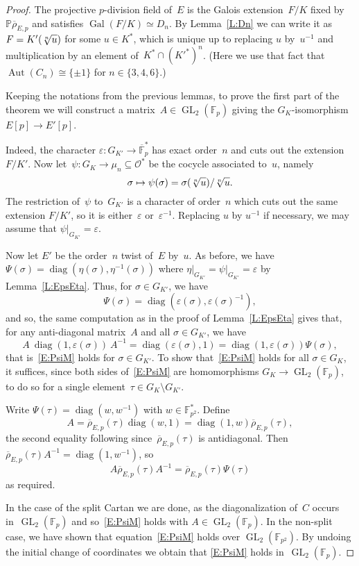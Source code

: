 \documentclass[twoside,leqno,symbols-for-thanks, draft]{rmi}
\numberwithin{equation}{section}
\newcommand{\F}{\mathbb{F}}
\newcommand{\Fp}{\mathbb{F}_p}
\newcommand{\PP}{\mathbb{P}}
\newcommand{\rhobar}{{\overline{\rho}}}
\newcommand{\eps}{\varepsilon}
\newcommand{\calO}{\mathcal{O}}
\DeclareMathOperator{\Aut}{Aut}
\DeclareMathOperator{\Gal}{Gal}
\newcommand{\GL}{\operatorname{GL}}
\newcommand{\diag}{{\operatorname{diag}}}
\theoremstyle{remark}
\begin{document}
\begin{proof} 
The projective $p$-division field of~$E$ is the Galois extension~$F/K$
fixed by $\PP \rhobar_{E,p}$ and satisfies $\Gal(F/K) \simeq D_n$. By
Lemma~\ref{L:Dn} we can write it as $F=K'(\root n\of u)$ for some
$u\in K^*$, which is unique up to replacing $u$ by~$u^{-1}$ and
multiplication by an element of~$K^*\cap(K'^*)^n$.  (Here we use that
fact that~$\Aut(C_n)\cong\{\pm1\}$ for $n\in\{3,4,6\}$.)

Keeping the notations from the previous lemmas, to prove the first
part of the theorem we will construct a matrix~$A\in\GL_2(\Fp)$
giving the $G_K$-isomorphism $E[p]\to E'[p]$.

Indeed, the character $\eps:G_{K'} \to
\overline{\F}_p^*$ has exact order~$n$ and cuts out the extension
$F/K'$.
Now let~$\psi:G_K\to \mu_n\subseteq\calO^*$ be the cocycle associated
to~$u$, namely
\[
\sigma\mapsto \psi(\sigma) = \sigma(\root n\of u)/\root n\of u.
\]
The restriction of~$\psi$ to~$G_{K'}$ is a character of order~$n$
which cuts out the same extension $F/K'$, so it is either~$\eps$ or~$\eps^{-1}$.  Replacing $u$ by $u^{-1}$ if necessary, we may assume that
$\left.\psi\right|_{G_{K'}} = \eps$.

Now let $E'$ be the order~$n$ twist of~$E$ by~$u$.  As before, we have
$\Psi(\sigma)=\diag(\eta(\sigma),\eta^{-1}(\sigma))$ where
$\left.\eta\right|_{G_{K'}} = \left.\psi\right|_{G_{K'}} = \eps$ by Lemma~\ref{L:EpsEta}.
Thus, for $\sigma\in G_{K'}$, we have
\[
\Psi(\sigma) = \diag(\eps(\sigma),\eps(\sigma)^{-1}),
\]
and so, the same computation as in the proof of Lemma~\ref{L:EpsEta} 
gives that, for any anti-diagonal matrix~$A$
and all $\sigma\in G_{K'}$, we have
\[
A\ \diag(1,\eps(\sigma))\ A^{-1} = \diag(\eps(\sigma),1) =
\diag(1,\eps(\sigma)) \Psi(\sigma),
\]
that is~\eqref{E:PsiM} holds for $\sigma\in G_{K'}$.  To show
that~\eqref{E:PsiM} holds for all $\sigma\in G_{K}$, it suffices,
since both sides of~\eqref{E:PsiM} are homomorphisms $G_K\to
\GL_2(\Fp)$, to do so for a single element~$\tau\in G_K\setminus
G_{K'}$.

Write $\Psi(\tau)=\diag(w,w^{-1})$ with $w\in\F_{p^2}^*$.  Define
\[
A=\rhobar_{E,p}(\tau)\diag(w,1)=\diag(1,w)\rhobar_{E,p}(\tau),
\]
the second equality following since~$\rhobar_{E,p}(\tau)$ is
antidiagonal.  Then $\rhobar_{E,p}(\tau)A^{-1}=\diag(1,w^{-1})$, so
\[
A \rhobar_{E,p}(\tau) A^{-1} = \rhobar_{E,p}(\tau)\Psi(\tau)
\]
as required.

In the case of the split Cartan we are done, as the diagonalization
of~$C$ occurs in~$\GL_2(\Fp)$ and so~\eqref{E:PsiM} holds with $A \in
\GL_2(\F_{p})$.  In the non-split case, we have shown that
equation~\eqref{E:PsiM} holds over $\GL_2(\F_{p^2})$. By undoing the
initial change of coordinates we obtain that \eqref{E:PsiM} holds
in~$\GL_2(\Fp)$.


\end{proof}
\end{document}
